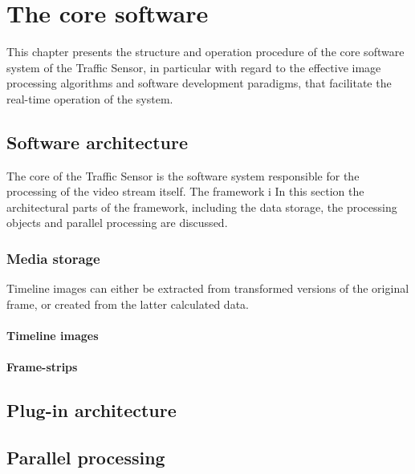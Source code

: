 \chapter{The core software}\label{chap:Core software}
This chapter presents the structure and operation procedure of the core software system of the Traffic Sensor, in particular with regard to the effective image processing algorithms and software development paradigms, that facilitate the real-time operation of the system.
\section{Software architecture}
The core of the Traffic Sensor is the software system responsible for the processing of the video stream itself.
The framework i
In this section the architectural parts of the framework, including the data storage, the processing objects and parallel processing are discussed.

\subsection{Media storage}
Timeline images can either be extracted from transformed versions of the original frame, or created from the latter calculated data.

\subsubsection{Timeline images}
\subsubsection{Frame-strips}

\section{Plug-in architecture}
\section{Parallel processing}
